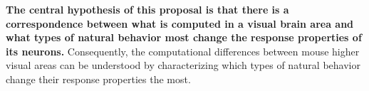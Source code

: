 \textbf{The central hypothesis of this proposal is that there is a correspondence between what is computed in a visual brain area and what types of natural behavior most change the response properties of its neurons.} Consequently, the computational differences between mouse higher visual areas can be understood by characterizing which types of natural behavior change their response properties the most.

